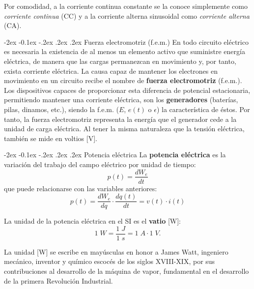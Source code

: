 \documentclass[11pt]{book} %
\makeatletter
\numberwithin{dummy}{section}
\theoremstyle{ocrenumbox}
\theoremstyle{blacknumex}
\theoremstyle{blacknumbox}
\theoremstyle{ocrenum}
\newenvironment{remark}{\par\vspace{10pt}\small %
\begin{list}{}{
\leftmargin=35pt %
\rightmargin=25pt}\item\ignorespaces %
\makebox[-2.5pt]{\begin{tikzpicture}[overlay]
\node[draw=ocre!60,line width=1pt,circle,fill=ocre!25,font=\sffamily\bfseries,inner sep=2pt,outer sep=0pt] at (-15pt,0pt){\textcolor{ocre}{N}};\end{tikzpicture}} %
\advance\baselineskip -1pt}{\end{list}\vskip5pt} %
\renewcommand{\subsubsection}{\@startsection {subsubsection}{3}{\z@}
{-2ex \@plus -0.1ex \@minus -.2ex}
{.2ex \@plus.2ex }
{\normalfont\small\sffamily\bfseries}}
\newlength\esp
\makeatother
\begin{document}
	Por comodidad, a la corriente continua constante se la conoce simplemente como \textit{corriente continua} (CC) y a la corriente alterna sinusoidal como \textit{corriente alterna} (CA).
	
	
	\subsubsection{Fuerza electromotriz (f.e.m.)}
	En todo circuito eléctrico es necesaria la existencia de al menos un elemento activo que suministre energía eléctrica, de manera que las cargas permanezcan en movimiento y, por tanto, exista corriente eléctrica. La causa capaz de mantener los electrones en movimiento en un circuito recibe el nombre de \textbf{fuerza electromotriz} (f.e.m.). Los dispositivos capaces de proporcionar esta diferencia de potencial estacionaria, permitiendo mantener una corriente eléctrica, son los \textbf{generadores} (baterías, pilas, dinamos, etc.), siendo la f.e.m. ($E$, $e(t)$ o $\epsilon$) la característica de éstos.  Por tanto, la fuerza electromotriz representa la energía que el generador cede a la unidad de carga eléctrica. Al tener la misma naturaleza que la tensión eléctrica, también se mide en voltios [V]. 
	
	\subsubsection{Potencia eléctrica}
	La \textbf{potencia eléctrica} es la variación del trabajo del campo eléctrico por unidad de tiempo:
	\begin{equation*}
		p(t)=\frac{dW_{e}}{dt} 
	\end{equation*}
	que puede relacionarse con las variables anteriores:
	\begin{equation*}\label{eq.pvi}
		p(t) = \frac{dW_e}{dq} \cdot \frac{dq(t)}{dt}= v(t)\cdot i(t)
	\end{equation*}
	
	La {unidad} de la potencia eléctrica en el SI es el \textbf{vatio} [W]: 
	\begin{equation*}
		1\;W = \dfrac{1\;J}{1\;s}= 1\;A\cdot 1\;V.
	\end{equation*}
	\begin{remark}
		La unidad [W] se escribe en mayúsculas en honor a James Watt, ingeniero mecánico, inventor y químico escocés de los siglos XVIII-XIX, por sus contribuciones al desarrollo de la máquina de vapor, fundamental en el desarrollo de la primera Revolución Industrial.
	\end{remark}
	
\end{document}
